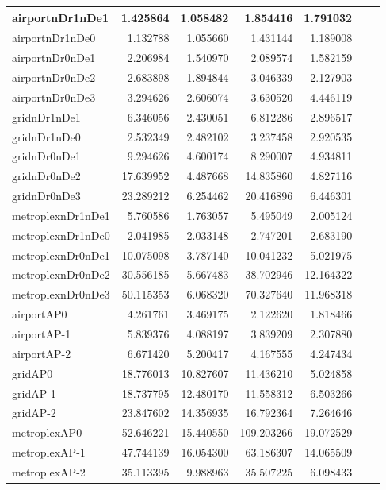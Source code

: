 \begin{longtable}{|l|r|r|r|r|r|r|}
\endlastfoot
airportnDr1nDe1 & 1.425864 & 1.058482 & 1.854416 & 1.791032 \\ \hline
airportnDr1nDe0 & 1.132788 & 1.055660 & 1.431144 & 1.189008 \\ \hline
airportnDr0nDe1 & 2.206984 & 1.540970 & 2.089574 & 1.582159 \\ \hline
airportnDr0nDe2 & 2.683898 & 1.894844 & 3.046339 & 2.127903 \\ \hline
airportnDr0nDe3 & 3.294626 & 2.606074 & 3.630520 & 4.446119 \\ \hline
gridnDr1nDe1 & 6.346056 & 2.430051 & 6.812286 & 2.896517 \\ \hline
gridnDr1nDe0 & 2.532349 & 2.482102 & 3.237458 & 2.920535 \\ \hline
gridnDr0nDe1 & 9.294626 & 4.600174 & 8.290007 & 4.934811 \\ \hline
gridnDr0nDe2 & 17.639952 & 4.487668 & 14.835860 & 4.827116 \\ \hline
gridnDr0nDe3 & 23.289212 & 6.254462 & 20.416896 & 6.446301 \\ \hline
metroplexnDr1nDe1 & 5.760586 & 1.763057 & 5.495049 & 2.005124 \\ \hline
metroplexnDr1nDe0 & 2.041985 & 2.033148 & 2.747201 & 2.683190 \\ \hline
metroplexnDr0nDe1 & 10.075098 & 3.787140 & 10.041232 & 5.021975 \\ \hline
metroplexnDr0nDe2 & 30.556185 & 5.667483 & 38.702946 & 12.164322 \\ \hline
metroplexnDr0nDe3 & 50.115353 & 6.068320 & 70.327640 & 11.968318 \\ \hline
airportAP0 & 4.261761 & 3.469175 & 2.122620 & 1.818466 \\ \hline
airportAP-1 & 5.839376 & 4.088197 & 3.839209 & 2.307880 \\ \hline
airportAP-2 & 6.671420 & 5.200417 & 4.167555 & 4.247434 \\ \hline
gridAP0 & 18.776013 & 10.827607 & 11.436210 & 5.024858 \\ \hline
gridAP-1 & 18.737795 & 12.480170 & 11.558312 & 6.503266 \\ \hline
gridAP-2 & 23.847602 & 14.356935 & 16.792364 & 7.264646 \\ \hline
metroplexAP0 & 52.646221 & 15.440550 & 109.203266 & 19.072529 \\ \hline
metroplexAP-1 & 47.744139 & 16.054300 & 63.186307 & 14.065509 \\ \hline
metroplexAP-2 & 35.113395 & 9.988963 & 35.507225 & 6.098433 \\ \hline

\end{longtable}
